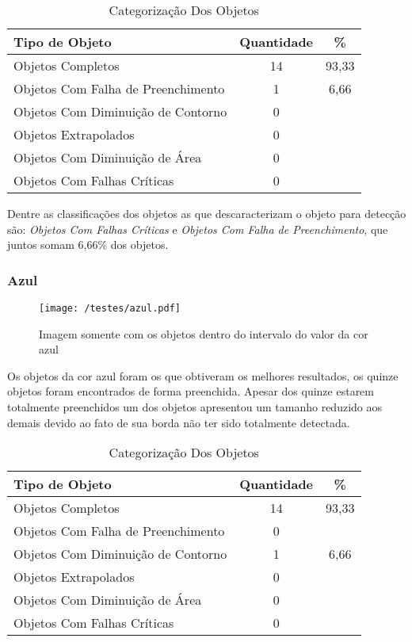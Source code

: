 	\begin{table}[H]
\centering
\begin{tabular}{l|c|c}
Tipo de Objeto & Quantidade & \%  \\%
\hline                               %
Objetos Completos & 14 & 93,33 \\
\hline 
Objetos Com Falha de Preenchimento & 1 & 6,66 \\
\hline 
Objetos Com Diminuição de Contorno & 0 &\\
\hline 
Objetos Extrapolados & 0 &\\
\hline 
Objetos Com Diminuição de Área &  0 &\\
\hline 
Objetos Com Falhas Críticas & 0 &\\
\hline 
\end{tabular}
\caption{Categorização Dos Objetos}
\end{table}

Dentre as classificações dos objetos as que descaracterizam o objeto para detecção são: \textit{Objetos Com Falhas Críticas} e \textit{Objetos Com Falha de Preenchimento}, que juntos somam 6,66\% dos objetos.

\subsubsection{Azul}
	\begin{figure}[H]
		\centering
		\texttt{[image: /testes/azul.pdf]}
		\caption{Imagem somente com os objetos dentro do intervalo do valor da cor azul}
		\label{disposicaoparte}
	\end{figure}

Os objetos da cor azul foram os que obtiveram os melhores resultados, os quinze objetos foram encontrados de forma preenchida.	Apesar dos quinze estarem totalmente preenchidos um dos objetos apresentou um tamanho reduzido aos demais devido ao fato de sua borda não ter sido totalmente detectada.

\begin{table}[h]
\centering
\begin{tabular}{l|c|c}
Tipo de Objeto & Quantidade & \% \\ %
\hline                               %
Objetos Completos & 14 & 93,33 \\
\hline 
Objetos Com Falha de Preenchimento & 0\\
\hline 
Objetos Com Diminuição de Contorno &  1 & 6,66
\\
\hline 
Objetos Extrapolados &  0\\
\hline 
Objetos Com Diminuição de Área & 0 \\
\hline 
Objetos Com Falhas Críticas & 0 \\
\hline 
\end{tabular}
\caption{Categorização Dos Objetos}
\end{table}

